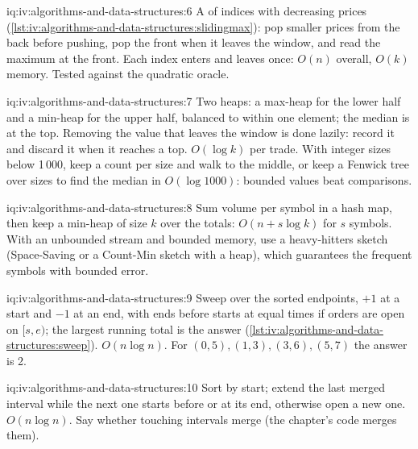 \begin{solution}{iq:iv:algorithms-and-data-structures:6}
A  of indices with decreasing prices (\cref{lst:iv:algorithms-and-data-structures:slidingmax}): pop smaller
prices from the back before pushing, pop the front when it leaves the window, and read the maximum at the front. Each index
enters and leaves once: $O(n)$ overall, $O(k)$ memory. Tested against the quadratic oracle.
\end{solution}

\begin{solution}{iq:iv:algorithms-and-data-structures:7}
Two heaps: a max-heap for the lower half and a min-heap for the upper half, balanced to within one element; the median is at the
top. Removing the value that leaves the window is done lazily: record it and discard it when it reaches a top. $O(\log k)$ per
trade. With integer sizes below 1\,000, keep a count per size and walk to the middle, or keep a Fenwick tree over sizes to find
the median in $O(\log 1000)$: bounded values beat comparisons.
\end{solution}

\begin{solution}{iq:iv:algorithms-and-data-structures:8}
Sum volume per symbol in a hash map, then keep a min-heap of size $k$ over the totals: $O(n + s\log k)$ for $s$ symbols. With an
unbounded stream and bounded memory, use a heavy-hitters sketch (Space-Saving or a Count-Min sketch with a heap), which
guarantees the frequent symbols with bounded error.
\end{solution}

\begin{solution}{iq:iv:algorithms-and-data-structures:9}
Sweep over the sorted endpoints, $+1$ at a start and $-1$ at an end, with ends before starts at equal times if orders are open on
$[s, e)$; the largest running total is the answer (\cref{lst:iv:algorithms-and-data-structures:sweep}). $O(n\log n)$. For
$(0,5), (1,3), (3,6), (5,7)$ the answer is 2.
\end{solution}

\begin{solution}{iq:iv:algorithms-and-data-structures:10}
Sort by start; extend the last merged interval while the next one starts before or at its end, otherwise open a new one.
$O(n\log n)$. Say whether touching intervals merge (the chapter's code merges them).
\end{solution}

